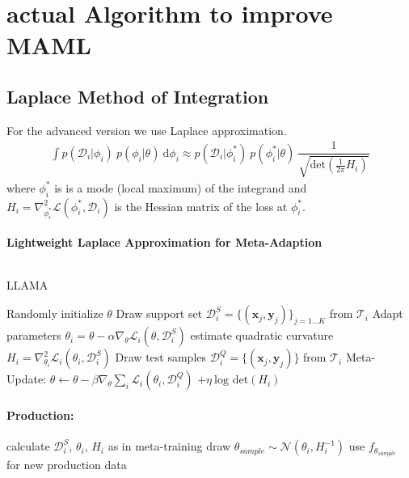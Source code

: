 \documentclass{article}
\begin{document}
	\section{actual Algorithm to improve MAML}
	
	\subsection{Laplace Method of Integration}
	For the advanced version we use Laplace approximation.
	\begin{align}
		\int p(\mathcal{D}_i \vert \phi_i) \: p(\phi_i \vert \theta) \: \text{d} \phi_i \approx p(\mathcal{D}_i \vert \phi_i^*) \: p(\phi_i^* \vert \theta) \: \dfrac{1}{\sqrt{\text{det}(\frac{1}{2 \pi} H_i)}}
	\end{align}
	where $\phi_i^*$ is is a mode (local maximum) of the integrand and $H_i = \nabla_{\phi_i^*}^2 \mathcal{L}(\phi_i^*, \mathcal{D}_i)$ is the Hessian matrix of the loss at $\phi_i^*$.
	
	\paragraph{Lightweight Laplace Approximation for Meta-Adaption} $\text{ }$
	
	\begin{algorithm}
		\caption{LLAMA}
		\begin{algorithmic}  
			\STATE Randomly initialize $\theta$
			\STATE Draw support set $\mathcal{D}_i^{S} = \{ (\boldsymbol{x}_j, \boldsymbol{y}_j)\}_{j=1...K}$ from $\mathcal{T}_i$
			\STATE Adapt parameters $\theta_i = \theta - \alpha \nabla_{\theta} \mathcal{L}_i(\theta, \mathcal{D}_i^{S}) $
			\STATE \textcolor{bostonuniversityred}{estimate quadratic curvature $H_i = \nabla_{\theta_i}^2 \mathcal{L}_i(\theta_i, \mathcal{D}_i^{S})$}
			\STATE Draw test samples  $\mathcal{D}_i^{Q} = \{(\boldsymbol{x}_j, \boldsymbol{y}_j)\}$ from $\mathcal{T}_i$
			\ENDFOR
			\STATE Meta-Update: $\theta \leftarrow \theta - \beta \nabla_{\theta} \sum_{i} \mathcal{L}_i(\theta_i, \mathcal{D}_{i}^{Q})$  \textcolor{bostonuniversityred}{$+ \eta \: \text{log det}(H_i)$}
			\ENDWHILE
		\end{algorithmic}
		\paragraph{Production:}
		\begin{algorithmic}
			\FOR{new Tasks $\mathcal{T}_i \sim p(\mathcal{T})$}
				\STATE calculate $\mathcal{D}_i^{S}$, $\theta_i$, $H_i$ as in meta-training
				\STATE \textcolor{bostonuniversityred}{ draw $\theta_{sample} \sim \mathcal{N}(\theta_i, H_i^{-1})$}
				\STATE use $f_{\theta_{sample}}$ for new production data
			\ENDFOR
		\end{algorithmic}
	\end{algorithm}
\end{document}
